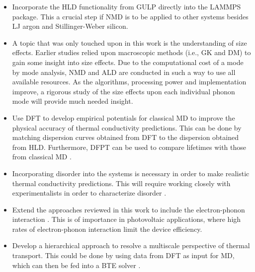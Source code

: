 \begin{itemize}
\item Incorporate the HLD functionality from GULP directly into the LAMMPS package. This a crucial step if NMD is to be applied to other systems besides LJ argon and Stillinger-Weber silicon.

\item A topic that was only touched upon in this work is the understanding of size effects. Earlier studies relied upon macroscopic methods (i.e., GK and DM) to gain some insight into size effects. Due to the computational cost of a mode by mode analysis, NMD and ALD are conducted in such a way to use all available resources. As the algorithms, processing power and implementation improve, a rigorous study of the size effects upon each individual phonon mode will provide much needed insight. 

\item Use DFT to develop empirical potentials for classical MD to improve the physical accuracy of thermal conductivity predictions. This can be done by matching dispersion curves obtained from DFT to the dispersion obtained from HLD. Furthermore, DFPT can be used to compare lifetimes with those from classical MD \cite{paulatto2013anharmonic}.

\item Incorporating disorder into the systems is necessary in order to make realistic thermal conductivity predictions. This will require working closely with experimentalists in order to characterize disorder \cite{millis2003towards}. 

\item Extend the approaches reviewed in this work to include the electron-phonon interaction \cite{PhysRevB.77.125209}. This is of importance in photovoltaic applications, where high rates of electron-phonon interaction limit the device efficiency.

\item Develop a hierarchical approach to resolve a multiscale perspective of thermal transport. This could be done by using data from DFT as input for MD, which can then be fed into a BTE solver \cite{pinedathesis}.
\end{itemize}

